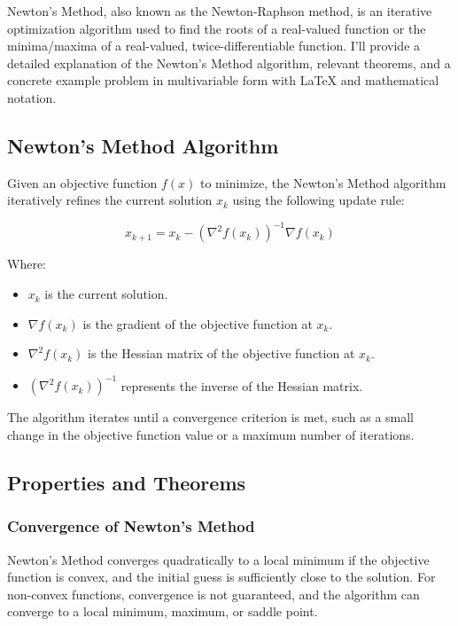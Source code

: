 \documentclass[a4paper]{article}
\begin{document}
Newton's Method, also known as the Newton-Raphson method, is an iterative optimization algorithm used to find the roots of a real-valued function or the minima/maxima of a real-valued, twice-differentiable function. I'll provide a detailed explanation of the Newton's Method algorithm, relevant theorems, and a concrete example problem in multivariable form with LaTeX and mathematical notation.

\subsection{Newton's Method Algorithm}

Given an objective function $f(x)$ to minimize, the Newton's Method algorithm iteratively refines the current solution $x_k$ using the following update rule:

\[
x_{k+1} = x_k - \left(\nabla^2 f(x_k)\right)^{-1} \nabla f(x_k)
\]

Where:
\begin{itemize}
  \item $x_k$ is the current solution.
  \item $\nabla f(x_k)$ is the gradient of the objective function at $x_k$.
  \item $\nabla^2 f(x_k)$ is the Hessian matrix of the objective function at $x_k$.
  \item $\left(\nabla^2 f(x_k)\right)^{-1}$ represents the inverse of the Hessian matrix.
\end{itemize}

The algorithm iterates until a convergence criterion is met, such as a small change in the objective function value or a maximum number of iterations.

\subsection{Properties and Theorems}

\subsubsection{Convergence of Newton's Method}

Newton's Method converges quadratically to a local minimum if the objective function is convex, and the initial guess is sufficiently close to the solution. For non-convex functions, convergence is not guaranteed, and the algorithm can converge to a local minimum, maximum, or saddle point.
\end{document}
